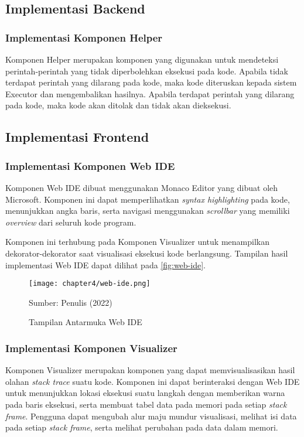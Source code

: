 \subsection{Implementasi Backend}
\subsubsection{Implementasi Komponen Helper}
Komponen Helper merupakan komponen yang digunakan untuk mendeteksi perintah-perintah yang tidak diperbolehkan eksekusi pada kode. Apabila tidak terdapat perintah yang dilarang pada kode, maka kode diteruskan kepada sistem Executor dan mengembalikan hasilnya. Apabila terdapat perintah yang dilarang pada kode, maka kode akan ditolak dan tidak akan dieksekusi.


\subsection{Implementasi Frontend}

\subsubsection{Implementasi Komponen Web IDE}
Komponen Web IDE dibuat menggunakan Monaco Editor yang dibuat oleh Microsoft. Komponen ini dapat memperlihatkan \textit{syntax highlighting} pada kode, menunjukkan angka baris, serta navigasi menggunakan \textit{scrollbar} yang memiliki \textit{overview} dari seluruh kode program.

Komponen ini terhubung pada Komponen Visualizer untuk menampilkan dekorator-dekorator saat visualisasi eksekusi kode berlangsung. Tampilan hasil implementasi Web IDE dapat dilihat pada \autoref{fig:web-ide}.

\begin{figure}[H]
  \centering
  \texttt{[image: chapter4/web-ide.png]}
  \caption{Tampilan Antarmuka Web IDE} \label{fig:web-ide}
  Sumber: Penulis (2022)
\end{figure}

\subsubsection{Implementasi Komponen Visualizer}
Komponen Visualizer merupakan komponen yang dapat memvisualisasikan hasil olahan \textit{stack trace} suatu kode. Komponen ini dapat berinteraksi dengan Web IDE untuk menunjukkan lokasi eksekusi suatu langkah dengan memberikan warna pada baris eksekusi, serta membuat tabel data pada memori pada setiap \textit{stack frame}. Pengguna dapat mengubah alur maju mundur visualisasi, melihat isi data pada setiap \textit{stack frame}, serta melihat perubahan pada data dalam memori.

